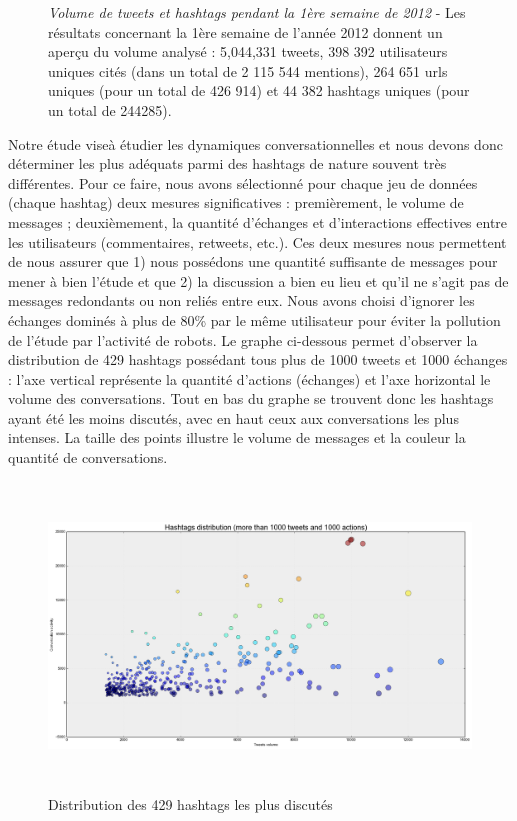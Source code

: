 \begin{figure}[ht]
    \caption[Volume de tweets et hashtags pendant la 1\`ere semaine de 2012]{\textit{Volume de tweets et hashtags pendant la 1\`ere semaine de 2012} - Les r\'esultats concernant la 1\`ere semaine de l{\textquoteright}ann\'ee 2012 donnent un aper\c{c}u du volume analys\'e : 5,044,331 tweets, 398 392 utilisateurs uniques cit\'es (dans un total de 2 115 544 mentions), 264 651 urls uniques (pour un total de 426 914) et 44 382 hashtags uniques (pour un total de 244285).}

\end{figure}



Notre \'etude vise\`a \'etudier les dynamiques conversationnelles et
nous devons donc d\'eterminer les plus ad\'equats parmi des hashtags de
nature souvent tr\`es diff\'erentes. Pour ce faire, nous avons
s\'electionn\'e pour chaque jeu de donn\'ees (chaque hashtag) deux
mesures significatives : premi\`erement, le volume de messages ;
deuxi\`emement, la quantit\'e d{\textquoteright}\'echanges et
d{\textquoteright}interactions effectives entre les utilisateurs
(commentaires, retweets, etc.). Ces deux mesures nous permettent de
nous assurer que 1) nous poss\'edons une quantit\'e suffisante de
messages pour mener \`a bien l{\textquoteright}\'etude et que 2) la
discussion a bien eu lieu et qu{\textquoteright}il ne
s{\textquoteright}agit pas de messages redondants ou non reli\'es entre
eux. Nous avons choisi d{\textquoteright}ignorer les \'echanges
domin\'es \`a plus de 80\% par le m\^eme utilisateur pour \'eviter la
pollution de l{\textquoteright}\'etude par l{\textquoteright}activit\'e
de robots. Le graphe ci-dessous permet d{\textquoteright}observer la
distribution de 429 hashtags poss\'edant tous plus de 1000 tweets et
1000 \'echanges : l{\textquoteright}axe vertical repr\'esente la
quantit\'e d{\textquoteright}actions (\'echanges) et
l{\textquoteright}axe horizontal le volume des conversations. Tout en
bas du graphe se trouvent donc les hashtags ayant \'et\'e les moins
discut\'es, avec en haut ceux aux conversations les plus intenses. La
taille des points illustre le volume de messages et la couleur la
quantit\'e de %
conversations.

\begin{figure}
    \centering
    \includegraphics[width=6.0114in,height=3.2114in]{figures/chap3/chapitre3-img8.png}
    \caption{Distribution des 429 hashtags les plus discut\'es}
\end{figure}


